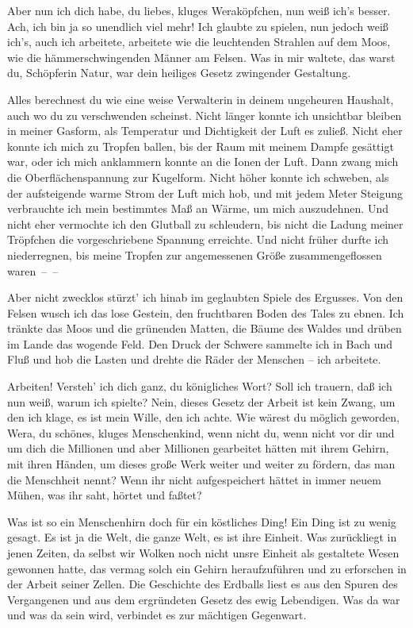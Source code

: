 Aber nun ich dich habe, du liebes, kluges Weraköpfchen, nun weiß
ich's besser. Ach, ich bin ja so unendlich viel mehr! Ich glaubte
zu spielen, nun jedoch weiß ich's, auch ich arbeitete, arbeitete
wie die leuchtenden Strahlen auf dem Moos, wie die
hämmerschwingenden Männer am Felsen. Was in mir waltete, das warst
du, Schöpferin Natur, war dein heiliges Gesetz zwingender
Gestaltung.

Alles berechnest du wie eine weise Verwalterin in deinem ungeheuren
Haushalt, auch wo du zu verschwenden scheinst. Nicht länger konnte
ich unsichtbar bleiben in meiner Gasform, als Temperatur und
Dichtigkeit der Luft es zuließ. Nicht eher konnte ich mich zu
Tropfen ballen, bis der Raum mit meinem Dampfe gesättigt war, oder
ich mich anklammern konnte an die Ionen der Luft. Dann zwang mich
die Oberflächenspannung zur Kugelform. Nicht höher konnte ich
schweben, als der aufsteigende warme Strom der Luft mich hob, und
mit jedem Meter Steigung verbrauchte ich mein bestimmtes Maß an
Wärme, um mich auszudehnen. Und nicht eher vermochte ich den
Glutball zu schleudern, bis nicht die Ladung meiner Tröpfchen die
vorgeschriebene Spannung erreichte. Und nicht früher durfte ich
niederregnen, bis meine Tropfen zur angemessenen Größe
zusammengeflossen waren~–~–

Aber nicht zwecklos stürzt' ich hinab im geglaubten Spiele des
Ergusses. Von den Felsen wusch ich das lose Gestein, den
fruchtbaren Boden des Tales zu ebnen. Ich tränkte das Moos und die
grünenden Matten, die Bäume des Waldes und drüben im Lande das
wogende Feld. Den Druck der Schwere sammelte ich in Bach und Fluß
und hob die Lasten und drehte die Räder der Menschen – ich
arbeitete.

Arbeiten! Versteh' ich dich ganz, du königliches Wort? Soll ich
trauern, daß ich nun weiß, warum ich spielte? Nein, dieses Gesetz
der Arbeit ist kein Zwang, um den ich klage, es ist mein Wille, den
ich achte. Wie wärest du möglich geworden, Wera, du schönes, kluges
Menschenkind, wenn nicht du, wenn nicht vor dir und um dich die
Millionen und aber Millionen gearbeitet hätten mit ihrem Gehirn,
mit ihren Händen, um dieses große Werk weiter und weiter zu
fördern, das man die Menschheit nennt? Wenn ihr nicht
aufgespeichert hättet in immer neuem Mühen, was ihr saht, hörtet
und faßtet?

Was ist so ein Menschenhirn doch für ein köstliches Ding! Ein Ding
ist zu wenig gesagt. Es ist ja die Welt, die ganze Welt, es ist
ihre Einheit. Was zurückliegt in jenen Zeiten, da selbst wir Wolken
noch nicht unsre Einheit als gestaltete Wesen gewonnen hatte, das
vermag solch ein Gehirn heraufzuführen und zu erforschen in der
Arbeit seiner Zellen. Die Geschichte des Erdballs liest es aus den
Spuren des Vergangenen und aus dem ergründeten Gesetz des ewig
Lebendigen. Was da war und was da sein wird, verbindet es zur
mächtigen Gegenwart.

